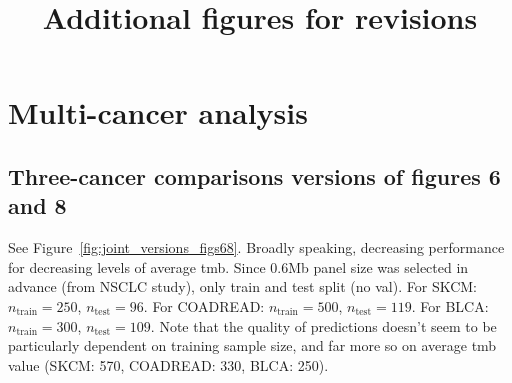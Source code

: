 \documentclass[12pt]{article}
\title{Additional figures for revisions}
\begin{document}
\section{Multi-cancer analysis}
\subsection{Three-cancer comparisons versions of figures 6 and 8}
See Figure~\ref{fig:joint_versions_figs68}. Broadly speaking, decreasing performance for decreasing levels of average \gls{tmb}. Since 0.6Mb panel size was selected in advance (from NSCLC study), only train and test split (no val). For SKCM: $n_{\text{train}} = 250$, $n_{\text{test}} = 96$. For COADREAD: $n_{\text{train}} = 500$, $n_{\text{test}} = 119$. For BLCA: $n_{\text{train}} = 300$, $n_{\text{test}} = 109$. Note that the quality of predictions doesn't seem to be particularly dependent on training sample size, and far more so on average \gls{tmb} value (SKCM: 570, COADREAD: 330, BLCA: 250). 
\end{document}
